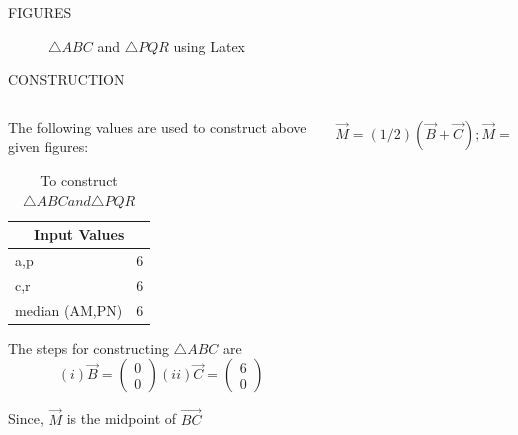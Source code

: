 \documentclass[11pt]{beamer}
\begin{document}
\begin{frame}{FIGURES}
\begin{figure}
\resizebox{10cm}{!}{}
\caption{$\triangle ABC$ and $\triangle PQR$ using Latex}
\end{figure}
\end{frame}

\begin{frame}{CONSTRUCTION}
\begin{columns}
\begin{column}{0.5\textwidth}
The following values are used to construct above given figures:
\begin{table}[htbp]
\centering
\resizebox{0.5\textwidth}{!}
{\begin{minipage}{\textwidth}
\begin{tabular}{ |p{3cm}|p{3cm}|  }
\hline
 \multicolumn{2}{|c|}{Input Values} \\
\hline
a,p & 6\\
\hline
c,r & 6\\
\hline
median (AM,PN) & 6 \\
\hline
\end{tabular}
\end{minipage}}
\caption{\tiny To construct $\triangle ABC and \triangle PQR $}
\end{table}



The steps for constructing $\triangle ABC$ are
\newline
$$(i)\vec{B}= \begin{pmatrix}0\\0\end{pmatrix}
(ii)\vec{C}=\begin{pmatrix}6\\0\end{pmatrix}$$

Since, $\vec{M}$ is the midpoint of $\vec{BC}$
\end{column}
\begin{column}{0.5\textwidth}
$$\vec{M}=(1/2)(\vec{B}+\vec{C});
\vec{M}=\begin{pmatrix}3\\0\end{pmatrix}$$


\end{column}
\end{columns}
\end{frame}
\end{document}

